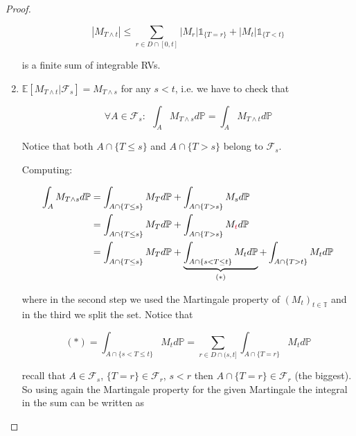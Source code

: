\documentclass[10pt,a4paper]{article}
\theoremstyle{definition}
\newcommand{\ind}{\mathds{1}}
\begin{document}
\begin{proof}
\begin{enumerate}
		      \begin{equation*}
		      	| M_{T\land t}| \leq \sum _{r\in D\cap [ 0,t]}| M_{r}| \ind_{\{T=r\}} +| M_{t}| \ind_{\{T< t\}}
		      \end{equation*}
		      
		      is a finite sum of integrable RVs.
		\item $\mathbb{E}[ M_{T\land t} |\mathcal{F}_{s}] =M_{T\land s}$ for any $s< t$, i.e. we have to check that
		      
		      \begin{equation*}
		      	\forall A\in \mathcal{F}_{s} :\ \ \int _{A} M_{T\land s} d\mathbb{P} =\int _{A} M_{T\land t} d\mathbb{P}
		      \end{equation*}
		      
		      Notice that both $A\cap \{T\leq s\}$ and $A\cap \{T >s\}$ belong to $\mathcal{F}_{s}$.
		      
		      Computing:
		      
		      \begin{align*}
		      	\int _{A} M_{T\land s} d\mathbb{P} & =\int _{A\cap \{T\leq s\}} M_{T} d\mathbb{P} +\int _{A\cap \{T >s\}} M_{s} d\mathbb{P}                                                                     \\
		      	                                   & =\int _{A\cap \{T\leq s\}} M_{T} d\mathbb{P} +\int _{A\cap \{T >s\}} M_{\textcolor[rgb]{0.82,0.01,0.11}{t}} d\mathbb{P}                                    \\
		      	                                   & =\int _{A\cap \{T\leq s\}} M_{T} d\mathbb{P} +\underbrace{\int _{A\cap \{s< T\leq t\}} M_{t} d\mathbb{P}}_{( *)} +\int _{A\cap \{T >t\}} M_{t} d\mathbb{P} 
		      \end{align*}
		      
		      where in the second step we used the Martingale property of $( M_{t})_{t\in \mathbb{T}}$ and in the third we split the set. Notice that
		      
		      \begin{equation*}
		      	( *) =\int _{A\cap \{s< T\leq t\}} M_{t} d\mathbb{P} =\sum _{r\in D\cap ( s,t]}\int _{A\cap \{T=r\}} M_{t} d\mathbb{P}
		      \end{equation*}
		      
		      recall that $A\in \mathcal{F}_{s}$, $\{T=r\} \in \mathcal{F}_{r}$, $s< r$ then $A\cap \{T=r\} \in \mathcal{F}_{r}$ (the biggest). So using again the Martingale property for the given Martingale the integral in the sum can be written as
		      

\end{enumerate}
\end{proof}
\end{document}
